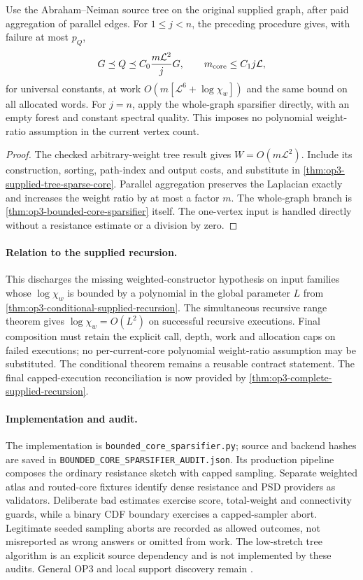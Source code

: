 \begin{corollary}
\label{cor:op3-weighted-constructor-contract}
Use the Abraham--Neiman source tree on the original supplied graph,
after paid aggregation of parallel edges. For $1\leq j<n$, the
preceding procedure gives, with failure at most $p_Q$,
\[
 G\preceq Q\preceq C_0\frac{m\mathcal L^2}{j}G,
 \qquad m_{\rm core}\leq C_1j\mathcal L,
\]
for universal constants, at work
$O(m[\mathcal L^6+\log\chi_w])$ and the same bound on all allocated
words. For $j=n$, apply the whole-graph sparsifier directly, with an
empty forest and constant spectral quality. This imposes no polynomial
weight-ratio assumption in the current vertex count.
\end{corollary}
\begin{proof}
The checked arbitrary-weight tree result gives $W=O(m\mathcal L^2)$.
Include its construction, sorting, path-index and output costs, and
substitute in \cref{thm:op3-supplied-tree-sparse-core}. Parallel
aggregation preserves the Laplacian exactly and increases the weight
ratio by at most a factor $m$. The whole-graph branch is
\cref{thm:op3-bounded-core-sparsifier} itself. The one-vertex input is
handled directly without a resistance estimate or a division by zero.
\end{proof}

\paragraph{Relation to the supplied recursion.}
This discharges the missing weighted-constructor hypothesis on input
families whose $\log\chi_w$ is bounded by a polynomial in the global
parameter $L$ from \cref{thm:op3-conditional-supplied-recursion}.
The simultaneous recursive range theorem gives $\log\chi_w=O(L^2)$
on successful recursive executions. Final composition must retain the
explicit call, depth, work and allocation caps on failed executions;
no per-current-core polynomial weight-ratio assumption may be substituted.
The conditional theorem remains a reusable contract statement. The final
capped-execution reconciliation is now provided by
\cref{thm:op3-complete-supplied-recursion}.

\paragraph{Implementation and audit.}
The implementation is \texttt{bounded\_core\_sparsifier.py}; source and
backend hashes are saved in \texttt{BOUNDED\_CORE\_SPARSIFIER\_AUDIT.json}.
Its production pipeline composes the ordinary resistance sketch with
capped sampling. Separate weighted atlas and routed-core fixtures identify
dense resistance and PSD providers as validators. Deliberate bad estimates
exercise score, total-weight and connectivity guards, while a binary CDF
boundary exercises a capped-sampler abort. Legitimate seeded sampling
aborts are recorded as allowed outcomes, not misreported as wrong answers
or omitted from work. The low-stretch tree algorithm is an explicit
source dependency and is not implemented by these audits. General OP3
and local support discovery remain \statusopen.

